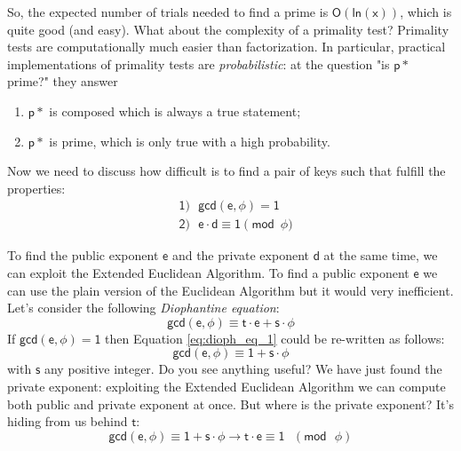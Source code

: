 \documentclass{article}
\newcounter{fact}[section]
\begin{document}
\par \noindent So, the expected number of trials needed to find a prime is $\mathsf{O(ln(x))}$, which is quite good (and easy). What about the complexity of a primality test? Primality tests are computationally much easier than factorization. In particular, practical implementations of primality tests are \textit{probabilistic}: at the question "is $\mathsf{p*}$ prime?" they answer
\begin{enumerate}
    \item $\mathsf{p*}$ is composed which is always a true statement;
    \item $\mathsf{p*}$ is prime, which is only true with a high probability.
\end{enumerate}

\par \noindent Now we need to discuss how difficult is to find a pair of keys such that fulfill the properties:
\begin{align*}
    &\mathsf{1) \text{ } gcd(e, \phi) = 1} \\
    &\mathsf{2) \text{ } e \cdot d \equiv 1 \pmod{\phi}}
\end{align*}

\par \noindent To find the public exponent $\mathsf{e}$ and the private exponent $\mathsf{d}$ at the same time, we can exploit the Extended Euclidean Algorithm. To find a public exponent $\mathsf{e}$ we can use the plain version of the Euclidean Algorithm but it would very inefficient. Let's consider the following \textit{Diophantine equation}:
\begin{equation}\label{eq:dioph_eq_1}
    \mathsf{gcd(e, \phi) \equiv t \cdot e + s \cdot \phi}
\end{equation}  
If $\mathsf{gcd(e, \phi) = 1}$ then Equation \ref{eq:dioph_eq_1} could be re-written as follows:
\begin{equation}\label{eq:dioph_eq_2}
    \mathsf{gcd(e, \phi) \equiv 1 + s \cdot \phi}
\end{equation}
with $\mathsf{s}$ any positive integer. Do you see anything useful? We have just found the private exponent: exploiting the Extended Euclidean Algorithm we can compute both public and private exponent at once. But where is the private exponent? It's hiding from us behind $\mathsf{t}$:
\begin{equation}\label{eq:dioph_eq_3}
    \mathsf{gcd(e, \phi) \equiv 1 + s \cdot \phi \rightarrow t \cdot e \equiv 1 \text{ } (mod \text{ } \phi)}
\end{equation}
\end{document}
